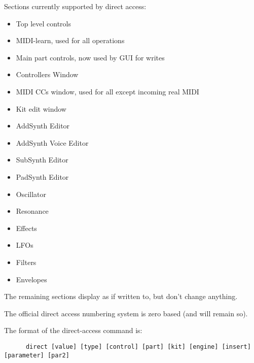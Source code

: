    Sections currently supported by direct access:

   \begin{itemize}
      \item Top level controls
      \item MIDI-learn, used for all operations
      \item Main part controls, now used by GUI for writes
      \item Controllers Window
      \item MIDI CCs window, used for all except incoming real MIDI
      \item Kit edit window
      \item AddSynth Editor
      \item AddSynth Voice Editor
      \item SubSynth Editor
      \item PadSynth Editor
      \item Oscillator
      \item Resonance
      \item Effects
      \item LFOs
      \item Filters
      \item Envelopes
   \end{itemize}

   The remaining sections display as if written to, but don't change anything.

   The official direct access numbering system is zero based (and will remain
   so).

%
%

   The format of the direct-access command is:

   \begin{verbatim}
      direct [value] [type] [control] [part] [kit] [engine] [insert] [parameter] [par2]
   \end{verbatim}

